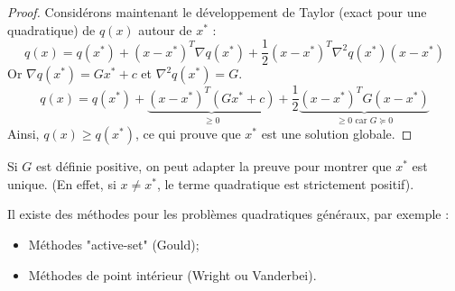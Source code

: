 \begin{proof}
        Considérons maintenant le développement de Taylor (exact pour une quadratique) de $q(x)$ autour de $x^*$ :
        \begin{equation}
            q(x) = q(x^*) + (x - x^*)^T \nabla q(x^*) + \frac{1}{2} (x - x^*)^T \nabla^2 q(x^*) (x - x^*)
        \end{equation}
        Or $\nabla q(x^*) = G x^* + c$ et $\nabla^2 q(x^*) = G$.
        \begin{equation}
            q(x) = q(x^*) + \underbrace{(x - x^*)^T (G x^* + c)}_{\ge 0} + \frac{1}{2} \underbrace{(x - x^*)^T G (x - x^*)}_{\ge 0 \text{ car } G \succeq 0}
        \end{equation}
        Ainsi, $q(x) \ge q(x^*)$, ce qui prouve que $x^*$ est une solution globale.
    \end{proof}

    \begin{remarque}
        Si $G$ est définie positive, on peut adapter la preuve pour montrer que $x^*$ est unique.
        (En effet, si $x \neq x^*$, le terme quadratique est strictement positif).
    \end{remarque}


\begin{remarque}
    Il existe des méthodes pour les problèmes quadratiques généraux, par exemple :
    \begin{itemize}
        \item Méthodes "active-set" (Gould);
        \item Méthodes de point intérieur (Wright ou Vanderbei).
    \end{itemize}
\end{remarque}

